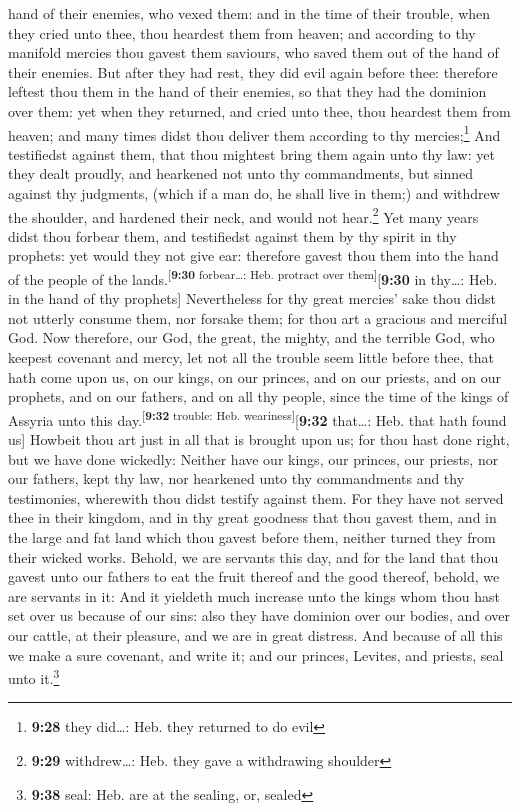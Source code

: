 hand of their enemies, who vexed them: and in the time of their trouble,
when they cried unto thee, thou heardest them from heaven; and according
to thy manifold mercies thou gavest them saviours, who saved them out of
the hand of their enemies.  But after they had rest, they
did evil again before thee: therefore leftest thou them in the hand of
their enemies, so that they had the dominion over them: yet when they
returned, and cried unto thee, thou heardest them from heaven; and many
times didst thou deliver them according to thy mercies;\footnote{\textbf{9:28}
  they did\ldots: Heb. they returned to do evil}  And
testifiedst against them, that thou mightest bring them again unto thy
law: yet they dealt proudly, and hearkened not unto thy commandments,
but sinned against thy judgments, (which if a man do, he shall live in
them;) and withdrew the shoulder, and hardened their neck, and would not
hear.\footnote{\textbf{9:29} withdrew\ldots: Heb. they gave a
  withdrawing shoulder}  Yet many years didst thou
forbear them, and testifiedst against them by thy spirit in thy
prophets: yet would they not give ear: therefore gavest thou them into
the hand of the people of the lands.\textsuperscript{{[}\textbf{9:30}
forbear\ldots: Heb. protract over them{]}}{[}\textbf{9:30} in thy\ldots:
Heb. in the hand of thy prophets{]}  Nevertheless for thy
great mercies' sake thou didst not utterly consume them, nor forsake
them; for thou art a gracious and merciful God.  Now
therefore, our God, the great, the mighty, and the terrible God, who
keepest covenant and mercy, let not all the trouble seem little before
thee, that hath come upon us, on our kings, on our princes, and on our
priests, and on our prophets, and on our fathers, and on all thy people,
since the time of the kings of Assyria unto this
day.\textsuperscript{{[}\textbf{9:32} trouble: Heb.
weariness{]}}{[}\textbf{9:32} that\ldots: Heb. that hath found us{]}
 Howbeit thou art just in all that is brought upon us;
for thou hast done right, but we have done wickedly: 
Neither have our kings, our princes, our priests, nor our fathers, kept
thy law, nor hearkened unto thy commandments and thy testimonies,
wherewith thou didst testify against them.  For they have
not served thee in their kingdom, and in thy great goodness that thou
gavest them, and in the large and fat land which thou gavest before
them, neither turned they from their wicked works. 
Behold, we are servants this day, and for the land that thou gavest unto
our fathers to eat the fruit thereof and the good thereof, behold, we
are servants in it:  And it yieldeth much increase unto
the kings whom thou hast set over us because of our sins: also they have
dominion over our bodies, and over our cattle, at their pleasure, and we
are in great distress.  And because of all this we make a
sure covenant, and write it; and our princes, Levites, and priests, seal
unto it.\footnote{\textbf{9:38} seal: Heb. are at the sealing, or,
  sealed}

